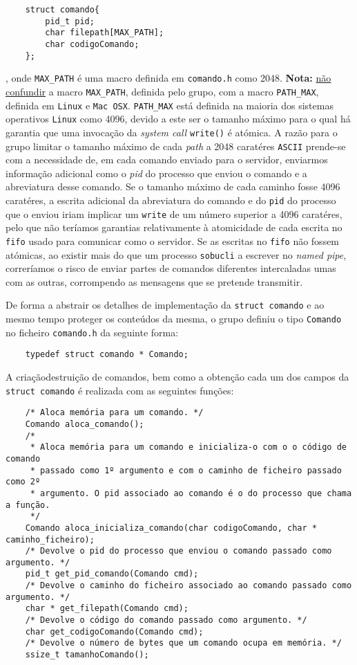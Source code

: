 \documentclass[a4paper,12pt,titlepage,draft,portuguese]{article}
\begin{document}
	\begin{verbatim}
	struct comando{
		pid_t pid;
		char filepath[MAX_PATH];
		char codigoComando;
	};
	\end{verbatim}
, onde \texttt{MAX\_PATH} é uma macro definida em \texttt{comando.h} como 2048.
\textbf{Nota:} \underline{não confundir} a macro \texttt{MAX\_PATH}, definida pelo grupo, com a macro \texttt{PATH\_MAX}, definida em \texttt{Linux} e \texttt{Mac OSX}. \texttt{PATH\_MAX} está definida na maioria dos sistemas operativos \texttt{Linux} como 4096, devido a este ser o tamanho máximo para o qual há garantia que uma invocação da \emph{system call} \texttt{write()} é atómica. A razão para o grupo limitar o tamanho máximo de cada \emph{path} a 2048 caratéres \texttt{ASCII} prende-se com a necessidade de, em cada comando enviado para o servidor, enviarmos informação adicional como o \emph{pid} do processo que enviou o comando e a abreviatura desse comando. Se o tamanho máximo de cada caminho fosse 4096 caratéres, a escrita adicional da abreviatura do comando e do \texttt{pid} do processo que o enviou iriam implicar um \texttt{write} de um número superior a 4096 caratéres, pelo que não teríamos garantias relativamente à atomicidade de cada escrita no \texttt{fifo} usado para comunicar como o servidor. Se as escritas no \texttt{fifo} não fossem atómicas, ao existir mais do que um processo \texttt{sobucli} a escrever no \emph{named pipe}, correríamos o risco de enviar partes de comandos diferentes intercaladas umas com as outras, corrompendo as mensagens que se pretende transmitir.

De forma a abstrair os detalhes de implementação da \texttt{struct comando} e ao mesmo tempo proteger os conteúdos da mesma, o grupo definiu o tipo \texttt{Comando} no ficheiro \texttt{comando.h} da seguinte forma:

	\begin{verbatim}
	typedef struct comando * Comando;
	\end{verbatim}

A criação\/destruição de comandos, bem como a obtenção cada um dos campos da \texttt{struct comando} é realizada com as seguintes funções:

	\begin{verbatim}
	/* Aloca memória para um comando. */
	Comando aloca_comando();
	/* 
	 * Aloca memória para um comando e inicializa-o com o o código de comando
	 * passado como 1º argumento e com o caminho de ficheiro passado como 2º
	 * argumento. O pid associado ao comando é o do processo que chama a função.
	 */
	Comando aloca_inicializa_comando(char codigoComando, char * caminho_ficheiro);
	/* Devolve o pid do processo que enviou o comando passado como argumento. */
	pid_t get_pid_comando(Comando cmd);
	/* Devolve o caminho do ficheiro associado ao comando passado como argumento. */
	char * get_filepath(Comando cmd);
	/* Devolve o código do comando passado como argumento. */
	char get_codigoComando(Comando cmd);
	/* Devolve o número de bytes que um comando ocupa em memória. */
	ssize_t tamanhoComando();
	\end{verbatim}
\end{document}
